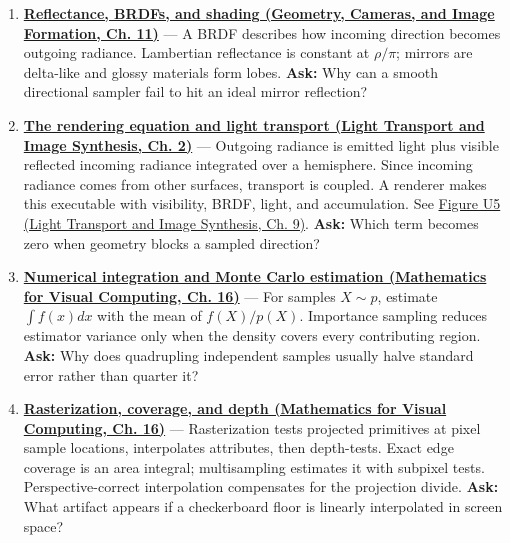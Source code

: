 \begin{enumerate}
\item
  \textbf{\href{../03-Geometry-Cameras-and-Image-Formation/main.pdf\#nameddest=03-visual-computing-i-ch004-reflectance-brdfs-and-shading}{Reflectance, BRDFs, and shading (Geometry, Cameras, and Image Formation, Ch. 11)}} --- A BRDF describes how incoming direction becomes outgoing radiance. Lambertian reflectance is constant at \(\rho/\pi\); mirrors are delta-like and glossy materials form lobes. \textbf{Ask:} Why can a smooth directional sampler fail to hit an ideal mirror reflection?
\item
  \textbf{\href{../04-Light-Transport-and-Image-Synthesis/main.pdf\#nameddest=03-visual-computing-i-ch007-the-rendering-equation-and-light-transport}{The rendering equation and light transport (Light Transport and Image Synthesis, Ch. 2)}} --- Outgoing radiance is emitted light plus visible reflected incoming radiance integrated over a hemisphere. Since incoming radiance comes from other surfaces, transport is coupled. A renderer makes this executable with visibility, BRDF, light, and accumulation. See \href{../04-Light-Transport-and-Image-Synthesis/main.pdf\#nameddest=04-visual-computing-ii-ch035-figure-u5---a-direct-light-renderer-makes-the-pipeline-executable}{Figure U5 (Light Transport and Image Synthesis, Ch. 9)}. \textbf{Ask:} Which term becomes zero when geometry blocks a sampled direction?
\item
  \textbf{\href{../02-Mathematics-for-Visual-Computing/main.pdf\#nameddest=03-visual-computing-i-ch012-numerical-integration-and-monte-carlo-estimation}{Numerical integration and Monte Carlo estimation (Mathematics for Visual Computing, Ch. 16)}} --- For samples \(X\sim p\), estimate \(\int f(x)dx\) with the mean of \(f(X)/p(X)\). Importance sampling reduces estimator variance only when the density covers every contributing region. \textbf{Ask:} Why does quadrupling independent samples usually halve standard error rather than quarter it?
\item
  \textbf{\href{../02-Mathematics-for-Visual-Computing/main.pdf\#nameddest=03-visual-computing-i-ch012-rasterization-coverage-and-depth}{Rasterization, coverage, and depth (Mathematics for Visual Computing, Ch. 16)}} --- Rasterization tests projected primitives at pixel sample locations, interpolates attributes, then depth-tests. Exact edge coverage is an area integral; multisampling estimates it with subpixel tests. Perspective-correct interpolation compensates for the projection divide. \textbf{Ask:} What artifact appears if a checkerboard floor is linearly interpolated in screen space?

\end{enumerate}
